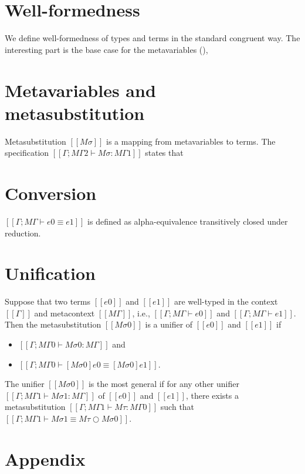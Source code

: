 \documentclass[acmsmall,natbib=false,review,anonymous]{acmart}
\begin{document}
\section{Well-formedness}

We define well-formedness of types and terms
in the standard congruent way.
The interesting part is the base case for the metavariables
(),

  \begin{ottdefnblock}[]{\ottdefnHeaderWfWF}{}
    \ottusedrule{\ottdruleWfWFVarLabeled[]{}}
    \ottusedrule{\ottdruleWfWFPLamLabeled[]{}}
    \ottusedrule{\ottdruleWfWFAVarLabeled[]{}}
  \end{ottdefnblock}


\section{Metavariables and metasubstitution}

\begin{definition}
  Metasubstitution $[[Mσ]]$
  is a mapping from metavariables to terms.
  The  specification 
  $[[Γ; MΓ2 ⊢ Mσ : MΓ1]]$ states that
\end{definition}


\section{Conversion}

\begin{definition}
 $[[Γ; MΓ ⊢ e0 ≡ e1]]$
 is defined as alpha-equivalence 
 transitively closed under reduction. 
\end{definition}



\section{Unification}


\begin{definition}
  Suppose that two terms $[[e0]]$ and 
  $[[e1]]$ are well-typed in the context $[[Γ]]$
  and metacontext $[[MΓ]]$, i.e., $[[Γ; MΓ ⊢ e0]]$
  and $[[Γ; MΓ ⊢ e1]]$.
  Then the metasubstitution $[[Mσ0]]$ is a unifier
  of $[[e0]]$ and $[[e1]]$ if
  \begin{itemize}
    \item $[[Γ; MΓ0 ⊢ Mσ0 : MΓ]]$ and
    \item $[[Γ; MΓ0 ⊢ [Mσ0]e0 ≡ [Mσ0]e1]]$.
  \end{itemize}

  The unifier $[[Mσ0]]$ is the most general if 
  for any other unifier $[[Γ; MΓ1 ⊢ Mσ1 : MΓ]]$ 
  of $[[e0]]$ and $[[e1]]$,
  there exists a metasubstitution $[[Γ; MΓ1 ⊢ Mτ : MΓ0]]$
  such that $[[Γ; MΓ1 ⊢ Mσ1 ≡ Mτ ○ Mσ0]]$.
\end{definition}


\newpage

\appendix

\section{Appendix}

\ottdefnRedRedLabeled{}

\ottdefnWfWFLabeled{}
\end{document}
